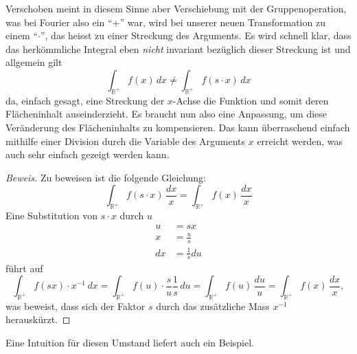 Verschoben meint in diesem Sinne aber Verschiebung mit der 
Gruppenoperation, was bei Fourier also ein ``+'' war, wird bei 
unserer neuen Transformation zu einem ``$\cdot$'', das heisst zu 
einer Streckung des Arguments. 
Es wird schnell klar, dass das herkömmliche Integral eben {\em nicht} 
invariant bezüglich dieser Streckung ist und allgemein gilt 
\begin{equation}
    \int_\mathbb{R^+} 
    f(x)\,{d}x \neq \int_\mathbb{R^+} f(s \cdot x)\,{d}x
    \label{mellin:ungl}
\end{equation}
da, einfach gesagt, eine Streckung der $x$-Achse die Funktion und 
somit deren Flächeninhalt auseinderzieht.
Es braucht nun also eine Anpassung, um diese Veränderung des 
Flächeninhalts zu kompensieren.
Das kann überraschend einfach mithilfe einer Division durch die 
Variable des Arguments $x$ erreicht werden, was auch sehr einfach 
gezeigt werden kann.
\begin{proof}[Beweis]
    Zu beweisen ist die folgende Gleichung:
    \[
        \int_\mathbb{R^+} f(s \cdot x)\,\frac{{d}x}{x} 
        = \int_\mathbb{R^+} f(x)\,\frac{{d}x}{x}
    \]
    Eine Substitution von $s \cdot x$ durch $u$
    \begin{align*}
        u &= sx \\
        x &= \frac{u}{s} \\
        {d}x &= \frac{1}{s} {d}u
    \end{align*}
    führt auf
    \[
        \int_\mathbb{R^+} f(sx) \cdot x^{-1}\,{d}x 
        = \int_\mathbb{R^+} f(u) \cdot \frac{s}{u} \frac{1}{s}\,{d}u
        = \int_\mathbb{R^+} f(u)\,\frac{{d}u}{u}
        = \int_\mathbb{R^+} f(x)\,\frac{{d}x}{x}
        ,
    \]
    was beweist, dass sich der Faktor $s$ durch das zusätzliche Mass 
    $x^{-1}$ herauskürzt.
\end{proof}
Eine Intuition für diesen Umstand liefert auch ein Beispiel.
